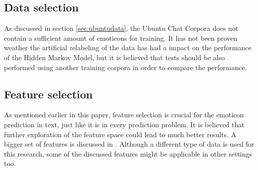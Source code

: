 


\subsection{Data selection}
As discussed in section \ref{sec:ubuntudata}, the Ubuntu Chat Corpora does not contain a sufficient amount of emoticons for training. It has not been proven weather the artificial relabeling of the data has had a impact on the performance of the Hidden Markov Model, but it is believed that tests should be also performed using another training corpora in order to compare the performance. 


\subsection{Feature selection}

As mentioned earlier in this paper, feature selection is crucial for the emoticon prediction in text, just like it is in every prediction problem. It is believed that further exploration of the feature space could lead to much better results. A bigger set of features is discussed in \cite{fairytales}. Although a different type of data is used for this research, some of the discussed features might be applicable in other settings too. 

